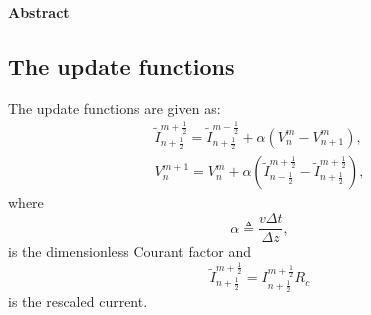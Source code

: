 \documentclass[dutch, a4paper, 11pt]{article}
\begin{document}



\begin{tcolorbox}[colframe=ugent_blue, colback=ugent_blue!10, enhanced jigsaw, boxrule=0.5pt]
{\bf Abstract}\\
\lipsum[1- 2]
\end{tcolorbox}



\begin{multicols}{2}  %
\section{The update functions}
The update functions are given as:
\begin{align}
    \tilde{I}^{m+\frac{1}{2}}_{n+\frac{1}{2}} = \tilde{I}^{m-\frac{1}{2}}_{n+\frac{1}{2}} + \alpha\left(V^{m}_{n} - V^{m}_{n+1}\right),\\
    V^{m+1}_n = V^{m}_{n} + \alpha\left(\tilde{I}^{m+\frac{1}{2}}_{n-\frac{1}{2}}-\tilde{I}^{m+\frac{1}{2}}_{n+\frac{1}{2}}\right),
    \label{update}
\end{align}
where
\begin{equation}
    \alpha \triangleq \frac{v\Delta t}{\Delta z},
    \label{alpha}
\end{equation}
is the dimensionless Courant factor and
\begin{equation}
    \tilde{I}^{m+\frac{1}{2}}_{n+\frac{1}{2}} = I^{m+\frac{1}{2}}_{n+\frac{1}{2}}R_c
    \label{Itil}
\end{equation}
is the rescaled current.


\end{multicols}
\end{document}
